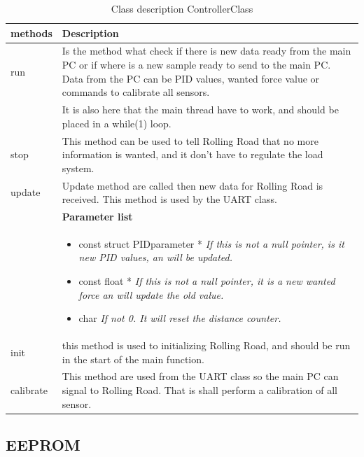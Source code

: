 \begin{table}[h!]
	\centering
	\begin{tabular}{|p{5 cm}|p{10 cm}|}
		\hline
		\textbf{methods} & \textbf{Description} \\ \hline
		
		run
		& Is the method what check if there is new data ready from the main PC or if where is a new sample ready to send to the main PC. Data from the PC can be PID values, wanted force value or commands to calibrate all sensors. 
		\\ & It is also here that the main thread have to work, and should be placed in a while(1) loop. \\ 
		\hline
		
		stop
		& This method can be used to tell Rolling Road that no more information is wanted, and it don't have to regulate the load system. 
		\\ \hline
		
		update
		& Update method are called then new data for Rolling Road is received. This method is used by the UART class.
		\\ & \textbf{Parameter list}
		\\ & \begin{itemize}
			\item {\large const struct PIDparameter *}
			\subitem \textit{If this is not a null pointer, is it new PID values, an will be updated.}
			\item {\large const float *}
			\subitem \textit{If this is not a null pointer, it is a new wanted force an will update the old value.}
			\item {\large char}
			\subitem \textit{If not 0. It will reset the distance counter.}
		\end{itemize}
		\\ \hline
		
		init
		& this method is used to initializing Rolling Road, and should be run in the start of the main function.  
		\\ \hline
		
		calibrate
		& This method are used from the UART class so the main PC can signal to Rolling Road. That is shall perform a calibration of all sensor.
		\\ \hline
	\end{tabular}
	\caption{Class description ControllerClass}
	\label{table:Class_description_ControllerClass_RR_PSoC}
\end{table}

\subsection{EEPROM}

